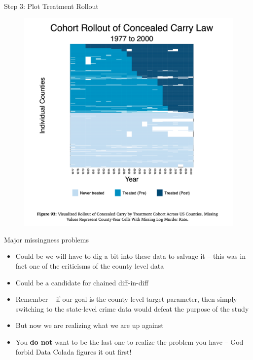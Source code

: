 \documentclass{beamer}
\begin{document}
\begin{frame}{Step 3: Plot Treatment Rollout}

\begin{figure}
    \centering
    \includegraphics[height=0.95\textheight]{./lecture_includes/step3_panelview}
\end{figure}

\end{frame}


\begin{frame}{Major missingness problems}

\begin{itemize}

\item Could be we will have to dig a bit into these data to salvage it -- this was in fact one of the criticisms of the county level data
\item Could be a candidate for chained diff-in-diff
\item Remember -- if our goal is the county-level target parameter, then simply switching to the state-level crime data would defeat the purpose of the study
\item But now we are realizing what we are up against
\item You \textbf{do not} want to be the last one to realize the problem you have -- God forbid Data Colada figures it out first!

\end{itemize}

\end{frame}
\end{document}
